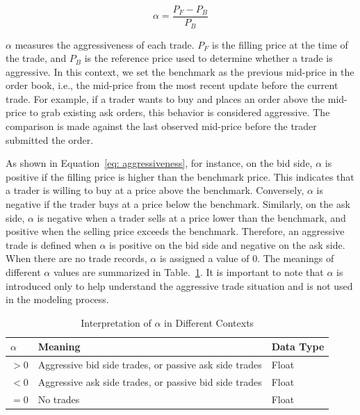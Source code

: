 \begin{equation}
    \alpha = \frac{P_F - P_B}{P_B}
    \label{eq: aggressiveness}
\end{equation}

$\alpha$ measures the aggressiveness of each trade. $P_F$ is the filling price at the time of the trade, and $P_B$ is the reference price used to determine whether a trade is aggressive. In this context, we set the benchmark as the previous mid-price in the order book, i.e., the mid-price from the most recent update before the current trade. For example, if a trader wants to buy and places an order above the mid-price to grab existing ask orders, this behavior is considered aggressive. The comparison is made against the last observed mid-price before the trader submitted the order. 

As shown in Equation~\ref{eq: aggressiveness}, for instance, on the bid side, $\alpha$ is positive if the filling price is higher than the benchmark price. This indicates that a trader is willing to buy at a price above the benchmark. Conversely, $\alpha$ is negative if the trader buys at a price below the benchmark. Similarly, on the ask side, $\alpha$ is negative when a trader sells at a price lower than the benchmark, and positive when the selling price exceeds the benchmark. Therefore, an aggressive trade is defined when $\alpha$ is positive on the bid side and negative on the ask side. When there are no trade records, $\alpha$ is assigned a value of 0. The meanings of different $\alpha$ values are summarized in Table.~\ref{tb: alpha_meaning}. It is important to note that $\alpha$ is introduced only to help understand the aggressive trade situation and is not used in the modeling process. 

\begin{table}[h] 
    \centering 
    \begin{tabular}{lll} 
        \toprule 
        \textbf{$\alpha$} & \textbf{Meaning} & \textbf{Data Type} \\ 
        \midrule 
        $ > 0$ & Aggressive bid side trades, or passive ask side trades & Float \\
        $ < 0$ & Aggressive ask side trades, or passive bid side trades & Float \\ 
        $ = 0$ & No trades & Float \\  
        \bottomrule 
    \end{tabular} 
    \caption{Interpretation of $\alpha$ in Different Contexts}
    \label{tb: alpha_meaning}
\end{table}

